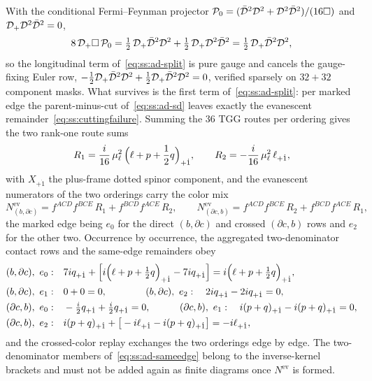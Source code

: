 With the conditional Fermi--Feynman projector
$\mathcal P_{0}=(\bar{\mathcal{D}}^{2}\mathcal{D}^{2}+\mathcal{D}^{2}\bar{\mathcal{D}}^{2})/(16\Box)$ and
$\mathcal{D}_{+}\mathcal{D}^{2}\bar{\mathcal{D}}^{2}=0$,
\begin{equation}\label{eq:ss:ad-projector}
8\,\mathcal{D}_{+}\Box\,\mathcal P_{0}
=\tfrac12\,\mathcal{D}_{+}\bar{\mathcal{D}}^{2}\mathcal{D}^{2}+\tfrac12\,\mathcal{D}_{+}\mathcal{D}^{2}\bar{\mathcal{D}}^{2}
=\tfrac12\,\mathcal{D}_{+}\bar{\mathcal{D}}^{2}\mathcal{D}^{2},
\end{equation}
so the longitudinal term of~\eqref{eq:ss:ad-split} is pure gauge and cancels
the gauge-fixing Euler row,
$-\tfrac12\mathcal{D}_{+}\bar{\mathcal{D}}^{2}\mathcal{D}^{2}+\tfrac12\mathcal{D}_{+}\bar{\mathcal{D}}^{2}\mathcal{D}^{2}=0$, verified
sparsely on $32+32$ component masks. What survives is the first term
of~\eqref{eq:ss:ad-split}: per marked edge the parent-minus-cut
of~\eqref{eq:ss:ad-sd} leaves exactly the evanescent
remainder~\eqref{eq:ss:cuttingfailure}. Summing the $36$ TGG routes per
ordering gives the two rank-one route sums
\begin{equation}\label{eq:ss:ad-r12}
R_{1}=\frac{i}{16}\,\mu_\ell^{2}\,\Big(\ell+p+\frac12q\Big)_{+\dot1},
\qquad
R_{2}=-\frac{i}{16}\,\mu_\ell^{2}\,\ell_{+\dot1},
\end{equation}
with $X_{+\dot1}$ the plus-frame dotted spinor component, and the evanescent
numerators of the two orderings carry the color mix
\begin{equation}\label{eq:ss:ad-nev}
N^{\mathrm{ev}}_{(b,\partial c)}
=f^{ACD}f^{BCE}\,R_{1}+f^{BCD}f^{ACE}\,R_{2},
\qquad
N^{\mathrm{ev}}_{(\partial c,b)}
=f^{ACD}f^{BCE}\,R_{2}+f^{BCD}f^{ACE}\,R_{1},
\end{equation}
the marked edge being $e_{0}$ for the direct $(b,\partial c)$ and crossed
$(\partial c,b)$ rows and $e_{2}$ for the other two. Occurrence by occurrence,
the aggregated two-denominator contact rows and the same-edge remainders obey
\begin{align}
(b,\partial c),\ e_{0}:&\quad
7iq_{+\dot1}+\Big[i\Big(\ell+p+\tfrac12q\Big)_{+\dot1}-7iq_{+\dot1}\Big]
=i\Big(\ell+p+\tfrac12q\Big)_{+\dot1},\notag\\
(b,\partial c),\ e_{1}:&\quad 0+0=0,
\qquad\qquad
(b,\partial c),\ e_{2}:\quad 2iq_{+\dot1}-2iq_{+\dot1}=0,\notag\\
(\partial c,b),\ e_{0}:&\quad
-\tfrac{i}{2}q_{+\dot1}+\tfrac{i}{2}q_{+\dot1}=0,
\qquad\quad
(\partial c,b),\ e_{1}:\quad
i(p+q)_{+\dot1}-i(p+q)_{+\dot1}=0,\notag\\
(\partial c,b),\ e_{2}:&\quad
i(p+q)_{+\dot1}+\big[-i\ell_{+\dot1}-i(p+q)_{+\dot1}\big]
=-i\ell_{+\dot1},
\label{eq:ss:ad-sameedge}
\end{align}
and the crossed-color replay exchanges the two orderings edge by edge. The
two-denominator members of~\eqref{eq:ss:ad-sameedge} belong to the
inverse-kernel brackets and must not be added again as finite diagrams once
$N^{\mathrm{ev}}$ is formed.

